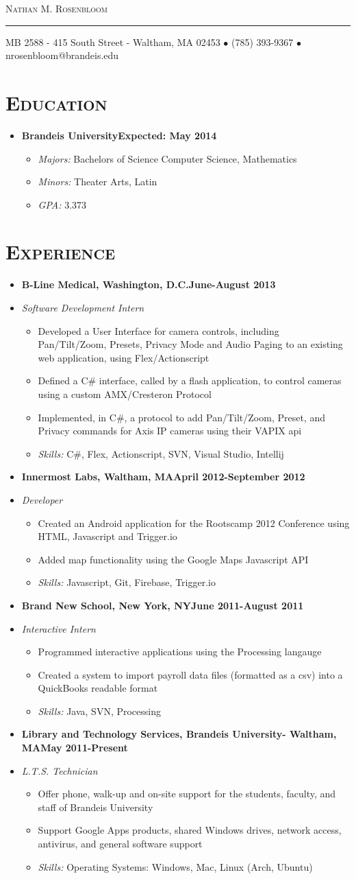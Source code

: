 \documentclass[11pt, oneside]{article}
\makeatletter
\newcommand{\lr}[2]{#1\hfill#2}
\newcommand{\name}{Nathan M. Rosenbloom}
\newcommand{\addr}{MB 2588 - 415 South Street - Waltham, MA 02453}
\newcommand{\phone}{(785) 393-9367}
\newcommand{\email}{nrosenbloom@brandeis.edu}
\newcommand{\resname}[4]{
  \begin{center}
    \selectfont\huge\scshape #1
    \normalfont
    \footnotesize
    \itshape
    \rule{\textwidth}{1pt}
    #2 $\bullet$ #3 $\bullet$ #4
    \normalfont
  \end{center}
}
\newcommand{\reseducation}[5]{
  \begin{ressection}{Education}
  \item[] \lr{\bfseries \selectfont #1\normalfont} {Expected: #2}
    \vspace{-8pt}
    \begin{itemize} \itemsep-2pt
      \item[] \textsl{Majors: }#4
      \item[] \textsl{Minors: }#5
      \item[] \textsl{GPA: }#3
    \end{itemize}
  \end{ressection}
}
\newcommand{\skills}[1]{
\item[] \textsl{Skills:} #1
}
\newenvironment{ressection}[1]{
  \section{\normalsize \scshape \selectfont #1 \normalfont}
  \vspace{-4pt}
  \begin{itemize} \itemsep-2pt
}{
  \end{itemize}
  \vspace{-20pt}
}
\newenvironment{resitem}[4]{
\item[] \lr{\bfseries \selectfont #1\normalfont, #2} {#3}
\item[] \textsl{#4}
  \vspace{-4pt}
  \begin{itemize} \itemsep-2pt
}{
  \end{itemize}
}
\makeatother
\begin{document}
\resname{\name}{\addr}{\phone}{\email}
\setcounter{secnumdepth}{-1} %
\reseducation{Brandeis University}{May 2014}{3.373}{Bachelors of Science Computer Science, Mathematics}{Theater Arts, Latin}
\begin{ressection}{Experience}
  \begin{resitem}{B-Line Medical}{Washington, D.C.}{June-August 2013}{Software Development Intern}
  \item Developed a User Interface for camera controls, including Pan/Tilt/Zoom, Presets, Privacy Mode and Audio Paging to an existing web application, using Flex/Actionscript
  \item Defined a C\# interface, called by a flash application, to control cameras using a custom AMX/Cresteron Protocol
  \item Implemented, in C\#, a protocol to add Pan/Tilt/Zoom, Preset, and Privacy commands for Axis IP cameras using their VAPIX api
    \skills{C\#, Flex, Actionscript, SVN, Visual Studio, Intellij}
  \end{resitem}
  \begin{resitem}{Innermost Labs}{Waltham, MA}{April 2012-September 2012}{Developer}
  \item Created an Android application for the Rootscamp 2012 Conference using HTML, Javascript  and Trigger.io
  \item Added map functionality using the Google Maps Javascript API
    \skills{Javascript, Git, Firebase, Trigger.io}
  \end{resitem}
  \begin{resitem}{Brand New School}{New York, NY}{June 2011-August 2011}{Interactive Intern}
  \item Programmed interactive applications using the Processing langauge
  \item Created a system to import payroll data files (formatted as a csv) into a QuickBooks readable format
    \skills{Java, SVN, Processing}
  \end{resitem}
  \begin{resitem}{Library and Technology Services}{Brandeis University- Waltham, MA}{May 2011-Present}{L.T.S. Technician} 
  \item Offer phone, walk-up and on-site support for the students, faculty, and staff of Brandeis University
  \item Support Google Apps products, shared Windows drives, network access, antivirus, and general software support 
    \skills{Operating Systems: Windows, Mac, Linux (Arch, Ubuntu)}
  \end{resitem}
\end{ressection}
\end{document}
